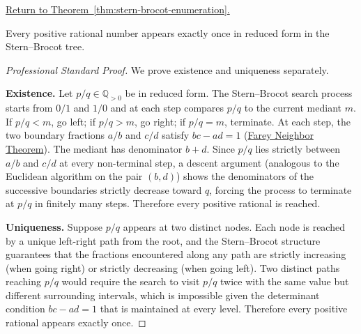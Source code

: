 
\newpage
{}
\label{prf:stern-brocot-enumeration}

\begin{remark*}[Return]
\hyperref[thm:stern-brocot-enumeration]{Return to Theorem~\ref*{thm:stern-brocot-enumeration}.}
\end{remark*}

\begin{theorem*}
Every positive rational number appears exactly once in reduced form in
the Stern--Brocot tree.
\end{theorem*}

\begin{proof}[Professional Standard Proof]
\LRAProofBodyStart
We prove existence and uniqueness separately.

\textbf{Existence.} Let $p/q \in \mathbb{Q}_{>0}$ be in reduced form.
The Stern--Brocot search process starts from $0/1$ and $1/0$ and at each
step compares $p/q$ to the current mediant $m$.  If $p/q < m$, go left;
if $p/q > m$, go right; if $p/q = m$, terminate.  At each step, the two
boundary fractions $a/b$ and $c/d$ satisfy $bc - ad = 1$
(\hyperref[thm:farey-neighbor-theorem]{Farey Neighbor Theorem}).  The
mediant has denominator $b + d$.  Since $p/q$ lies strictly between $a/b$
and $c/d$ at every non-terminal step, a descent argument (analogous to
the Euclidean algorithm on the pair $(b, d)$) shows the denominators of
the successive boundaries strictly decrease toward $q$, forcing the process
to terminate at $p/q$ in finitely many steps.
Therefore every positive rational is reached.

\textbf{Uniqueness.} Suppose $p/q$ appears at two distinct nodes.  Each
node is reached by a unique left-right path from the root, and the
Stern--Brocot structure guarantees that the fractions encountered along
any path are strictly increasing (when going right) or strictly decreasing
(when going left).  Two distinct paths reaching $p/q$ would require the
search to visit $p/q$ twice with the same value but different surrounding
intervals, which is impossible given the determinant condition
$bc - ad = 1$ that is maintained at every level.  Therefore every positive
rational appears exactly once.
\end{proof}

